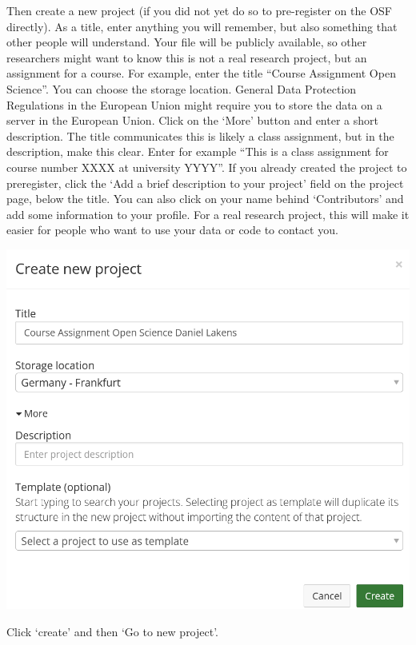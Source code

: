 \documentclass[
  oneside]{book}
\begin{document}
Then create a new project (if you did not yet do so to pre-register on the OSF directly). As a title, enter anything you will remember, but also something that other people will understand. Your file will be publicly available, so other researchers might want to know this is not a real research project, but an assignment for a course. For example, enter the title ``Course Assignment Open Science''. You can choose the storage location. General Data Protection Regulations in the European Union might require you to store the data on a server in the European Union. Click on the `More' button and enter a short description. The title communicates this is likely a class assignment, but in the description, make this clear. Enter for example ``This is a class assignment for course number XXXX at university YYYY''. If you already created the project to preregister, click the `Add a brief description to your project' field on the project page, below the title. You can also click on your name behind `Contributors' and add some information to your profile. For a real research project, this will make it easier for people who want to use your data or code to contact you.

\begin{center}\includegraphics[width=1\linewidth]{images/newosfproject} \end{center}

Click `create' and then `Go to new project'.
\end{document}
